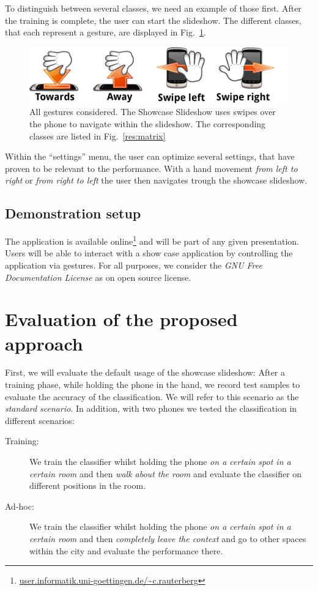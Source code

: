 \documentclass[conference]{IEEEtran}
\begin{document}
To distinguish between several classes, we need an example of those first. After the training is complete, the user can start the slideshow.
The different classes, that each represent a gesture, are displayed in Fig.~\ref{fig:classes}. 
\begin{figure}
\centering
\includegraphics[width=.8\columnwidth]{./pics/gestures3}
\caption{All gestures considered. The Showcase Slideshow uses swipes over the phone to navigate within the slideshow. The corresponding classes are listed in Fig.~\ref{res:matrix}}
\label{fig:classes}
\end{figure}
Within the ``settings'' menu, the user can optimize several settings, that have proven to be relevant to the performance.
With a hand movement \emph{from left to right} or \emph{from right to left} the user then navigates trough the showcase slideshow.

\subsection{Demonstration setup}
The application is available online\footnote{\url{user.informatik.uni-goettingen.de/~c.rauterberg}} and will be part of any given presentation.
Users will be able to interact with a show case application by controlling the application via gestures.
For all purposes, we consider the \emph{GNU Free Documentation License} as on open source license.

\section{Evaluation of the proposed approach}
First, we will evaluate the default usage of the showcase slideshow: 
After a training phase, while holding the phone in the hand, we record test samples to evaluate the accuracy of the classification. 
We will refer to this scenario as the \emph{standard scenario}.
In addition, with two phones we tested the classification in different scenarios:
\begin{description}
\item[Training: ] We train the classifier whilst holding the phone \emph{on a certain spot in a certain room} and then \emph{walk about the room} and evaluate the classifier on different positions in the room.
\item[Ad-hoc:  ] We train the classifier whilst holding the phone \emph{on a certain spot in a certain room} and then \emph{completely leave the context} and go to other spaces within the city and evaluate the performance there. 
\end{description}
\end{document}
